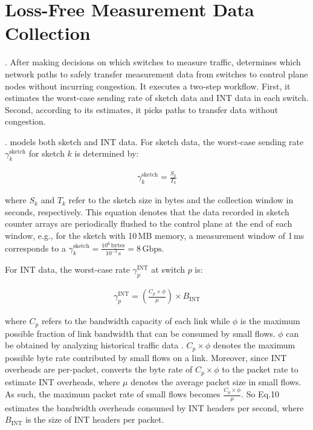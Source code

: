 \section{Loss-Free Measurement Data Collection}\label{collection}

. After making decisions on which switches to measure traffic, \sysname determines which network paths to safely transfer measurement data from switches to control plane nodes without incurring congestion. It executes a two-step workflow. First, it estimates the worst-case sending rate of sketch data and INT data in each switch. Second, according to its estimates, it picks paths to transfer data without congestion.

. \sysname models both sketch and INT data. For sketch data, the worst-case sending rate $\gamma_k^{\text{sketch}}$ for sketch $k$ is determined by:

\vspace{-4pt}
{\footnotesize
\begin{align}
\gamma_k^{\text{sketch}} = \frac{S_k}{T_k}
\end{align}}

\noindent where $S_k$ and $T_k$ refer to the sketch size in bytes and the collection window in seconds, respectively. This equation denotes that the data recorded in sketch counter arrays are periodically flushed to the control plane at the end of each window, e.g., for the sketch with 10\,MB memory, a measurement window of 1\,ms corresponds to a $\gamma_k^{\text{sketch}}=\frac{10^{6}\,\text{bytes}}{10^{-3}\,\text{s}}=8\,\text{Gbps}$.  

For INT data, the worst-case rate $\gamma_p^{\text{INT}}$ at switch $p$ is:

\vspace{-4pt}
{\footnotesize
\begin{align}
\gamma_p^{\text{INT}} = \left( \frac{C_p \times \phi}{\mu} \right)\times B_{\text{INT}} 
\end{align}}

\noindent where $C_p$ refers to the bandwidth capacity of each link while $\phi$ is the maximum possible fraction of link bandwidth that can be consumed by small flows. $\phi$ can be obtained by analyzing historical traffic data \cite{roy2015inside}. $C_p\times \phi$ denotes the maximum possible byte rate contributed by small flows on a link. Moreover, since INT overheads are per-packet, \sysname converts the byte rate of $C_p\times \phi$ to the packet rate to estimate INT overheads, where $\mu$ denotes the average packet size in small flows. As such, the maximum packet rate of small flows becomes $\frac{C_p \times \phi}{\mu}$. So Eq.10 estimates the bandwidth overheads consumed by INT headers per second, where $B_{\text{INT}}$ is the size of INT headers per packet. 

